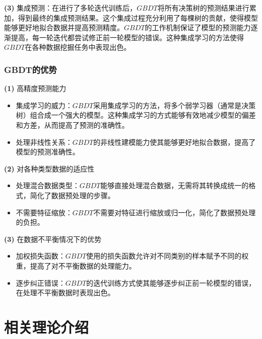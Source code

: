\documentclass[withoutpreface,bwprint]{cumcmthesis}
\begin{document}
\textbf{(3)} 集成预测：在进行了多轮迭代训练后，\(GBDT\)将所有决策树的预测结果进行累加，得到最终的集成预测结果。这个集成过程充分利用了每棵树的贡献，使得模型能够更好地拟合数据并提高预测精度。\(GBDT\)的工作机制保证了模型的预测能力逐渐提高，每一轮迭代都尝试修正前一轮模型的错误。这种集成学习的方法使得\(GBDT\)在各种数据挖掘任务中表现出色。

\subsubsection{GBDT的优势}

\textbf{(1)} 高精度预测能力

\begin{itemize}
    \item 集成学习的威力：\(GBDT\)采用集成学习的方法，将多个弱学习器（通常是决策树）组合成一个强大的模型。这种集成学习的方式能够有效地减少模型的偏差和方差，从而提高了预测的准确性。

    \item 处理非线性关系：\(GBDT\)的非线性建模能力使其能够更好地拟合数据，提高了模型的预测准确性。
    
\end{itemize}

\textbf{(2)} 对各种类型数据的适应性

\begin{itemize}
    \item 处理混合数据类型：\(GBDT\)能够直接处理混合数据，无需将其转换成统一的格式，简化了数据预处理的步骤。

    \item 不需要特征缩放：\(GBDT\)不需要对特征进行缩放或归一化，简化了数据预处理的负担。
    
\end{itemize}

\textbf{(3)} 在数据不平衡情况下的优势

\begin{itemize}
    \item 加权损失函数：\(GBDT\)使用的损失函数允许对不同类别的样本赋予不同的权重，提高了对不平衡数据的处理能力。

    \item 逐步纠正错误：\(GBDT\)的迭代训练方式使其能够逐步纠正前一轮模型的错误，在处理不平衡数据时表现出色。
    
\end{itemize}


\newpage
\section{相关理论介绍}
\end{document}
